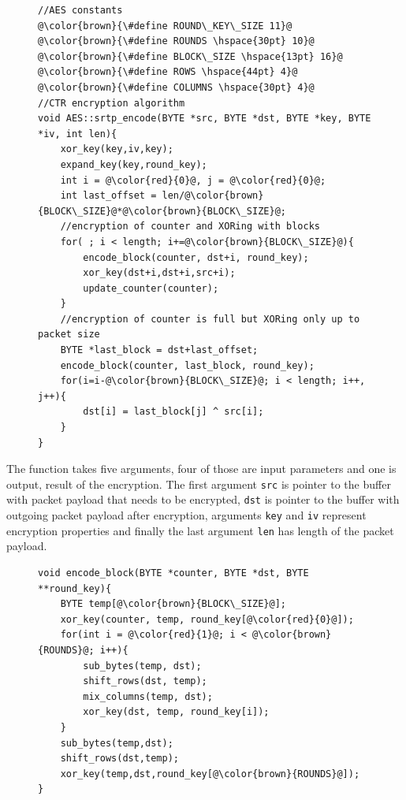 \begin{figure}[H]
\begin{lstlisting}
//AES constants
@\color{brown}{\#define ROUND\_KEY\_SIZE 11}@ 
@\color{brown}{\#define ROUNDS \hspace{30pt} 10}@ 
@\color{brown}{\#define BLOCK\_SIZE \hspace{13pt} 16}@ 
@\color{brown}{\#define ROWS \hspace{44pt} 4}@ 
@\color{brown}{\#define COLUMNS \hspace{30pt} 4}@ 
//CTR encryption algorithm
void AES::srtp_encode(BYTE *src, BYTE *dst, BYTE *key, BYTE *iv, int len){
    xor_key(key,iv,key);
    expand_key(key,round_key);
    int i = @\color{red}{0}@, j = @\color{red}{0}@;
    int last_offset = len/@\color{brown}{BLOCK\_SIZE}@*@\color{brown}{BLOCK\_SIZE}@;
    //encryption of counter and XORing with blocks
    for( ; i < length; i+=@\color{brown}{BLOCK\_SIZE}@){
        encode_block(counter, dst+i, round_key);
        xor_key(dst+i,dst+i,src+i);
        update_counter(counter);
    }
    //encryption of counter is full but XORing only up to packet size
    BYTE *last_block = dst+last_offset;
    encode_block(counter, last_block, round_key);
    for(i=i-@\color{brown}{BLOCK\_SIZE}@; i < length; i++, j++){
        dst[i] = last_block[j] ^ src[i];
    }
}
\end{lstlisting}
\end{figure}

The function takes five arguments, four of those are input parameters and one
is output, result of the encryption. The first argument \texttt{src} is pointer
to the buffer with packet payload that needs to be encrypted, \texttt{dst} is
pointer to the buffer with outgoing packet payload after encryption, arguments
\texttt{key} and \texttt{iv} represent encryption properties and finally the
last argument \texttt{len} has length of the packet payload.

\begin{figure}[H]
\begin{lstlisting}
void encode_block(BYTE *counter, BYTE *dst, BYTE **round_key){
    BYTE temp[@\color{brown}{BLOCK\_SIZE}@];
    xor_key(counter, temp, round_key[@\color{red}{0}@]);
    for(int i = @\color{red}{1}@; i < @\color{brown}{ROUNDS}@; i++){
        sub_bytes(temp, dst);
        shift_rows(dst, temp);
        mix_columns(temp, dst);
        xor_key(dst, temp, round_key[i]);
    }
    sub_bytes(temp,dst);
    shift_rows(dst,temp);
    xor_key(temp,dst,round_key[@\color{brown}{ROUNDS}@]);
}
\end{lstlisting}
\end{figure}

